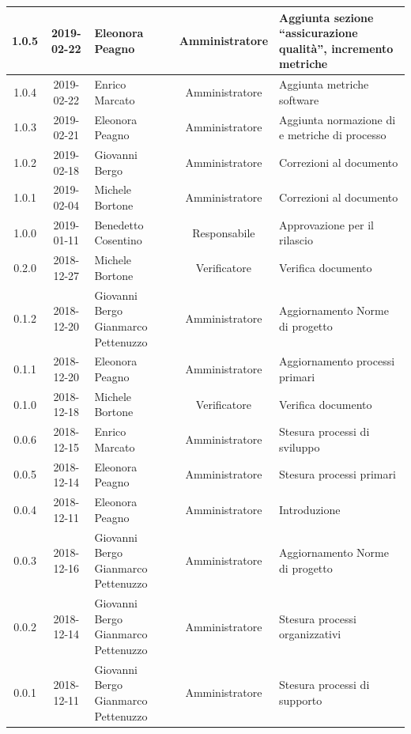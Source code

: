 \documentclass[11pt,a4paper]{article}
\begin{document}
{\begin{tabularx}{\textwidth}{ c | c | p{3.80cm} | c | X }
		1.0.5 & 2019-02-22 & Eleonora Peagno & Amministratore & Aggiunta sezione  ``assicurazione qualità'', incremento metriche \\ \hline
		1.0.4 & 2019-02-22 & Enrico Marcato & Amministratore & Aggiunta metriche software \\ \hline
		1.0.3 & 2019-02-21 & Eleonora Peagno & Amministratore & Aggiunta normazione di e metriche di processo \\ \hline
		1.0.2 & 2019-02-18 & Giovanni Bergo & Amministratore & Correzioni al documento \\ \hline
		1.0.1 & 2019-02-04 & Michele Bortone & Amministratore & Correzioni al documento \\ \hline
		1.0.0 & 2019-01-11 & Benedetto Cosentino & Responsabile & Approvazione per il rilascio \\ \hline
		0.2.0 & 2018-12-27 & Michele Bortone & Verificatore & Verifica documento \\ \hline
		0.1.2 & 2018-12-20 & Giovanni Bergo \newline Gianmarco Pettenuzzo & Amministratore & Aggiornamento Norme di progetto \\ \hline
		0.1.1 & 2018-12-20 & Eleonora Peagno & Amministratore & Aggiornamento processi primari \\ \hline
		0.1.0 & 2018-12-18 & Michele Bortone & Verificatore & Verifica documento \\ \hline
		0.0.6 & 2018-12-15 & Enrico Marcato & Amministratore & Stesura processi di \newline sviluppo \\ \hline
		0.0.5 & 2018-12-14 & Eleonora Peagno & Amministratore & Stesura processi primari \\ \hline
		0.0.4 & 2018-12-11 & Eleonora Peagno & Amministratore & Introduzione \\ \hline
		0.0.3 & 2018-12-16 & Giovanni Bergo \newline Gianmarco Pettenuzzo & Amministratore & Aggiornamento Norme di progetto \\ \hline
		0.0.2 & 2018-12-14 & Giovanni Bergo \newline Gianmarco Pettenuzzo & Amministratore & Stesura processi \newline organizzativi \\ \hline
		0.0.1 & 2018-12-11 & Giovanni Bergo \newline Gianmarco Pettenuzzo & Amministratore & Stesura processi di \newline supporto \\ \hline		
	\end{tabularx}
	
}
\end{document}
